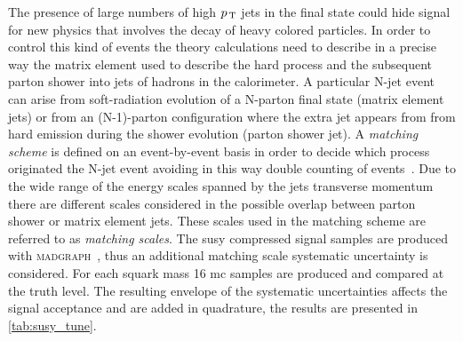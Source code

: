 The presence of large numbers of high $p_\mathrm{\, T}$ jets in the final state could hide
signal for new physics that involves the decay of heavy colored particles. In
order to control this kind of events the theory calculations need to describe in
a precise way the matrix element used to describe the hard process and the
subsequent parton shower into jets of hadrons in the calorimeter. A particular
N-jet event can arise from soft-radiation evolution of a N-parton final state
(matrix element jets) or from an (N-1)-parton configuration where the extra jet
appears from from hard emission during the shower evolution (parton shower
jet). A \emph{matching scheme} is defined on an event-by-event basis in order to
decide which process originated the N-jet event avoiding in this way double
counting of events~\cite{Matching}. Due to the wide range of the energy scales
spanned by the jets transverse momentum there are different scales considered in
the possible overlap between parton shower or matrix element jets. These scales
used in the matching scheme are referred to as \emph{matching scales}. The
\gls{susy} compressed signal samples are produced with
\textsc{madgraph}~\cite{MADGRAPH}, thus an additional matching scale systematic
uncertainty is considered. %
For each squark mass 16 \gls{mc} samples are produced and compared at the truth
level. The resulting envelope of the systematic uncertainties affects the signal
acceptance and are added in quadrature, the results are presented in
\cref{tab:susy_tune}.
\begin{table}[!h]
  \centering
\caption{Theoretical uncertainty in \% on the \gls{susy} compressed spectra
  signal region acceptance as function of the $\met$ bin in the signal region,
  from tune, matching, initial and final state radiation systematic
  uncertainties. The final value is a common envelope valid for all the
  \gls{susy} compressed models.}
  \label{tab:susy_tune}
\end{table}
